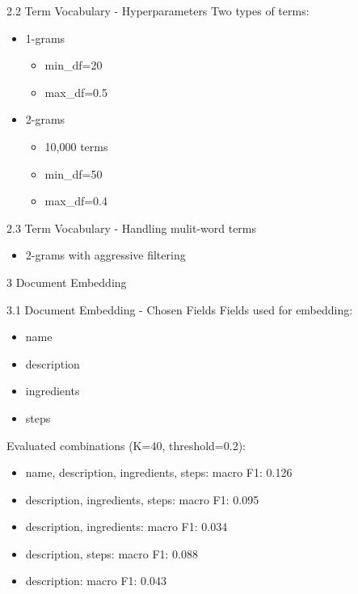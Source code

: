 \documentclass{beamer}
\begin{document}
\begin{frame}{2.2 Term Vocabulary - Hyperparameters}
  Two types of terms:
  \begin{itemize}
    \item 1-grams
          \begin{itemize}
            \item min\_df=20
            \item max\_df=0.5
          \end{itemize}
    \item 2-grams
          \begin{itemize}
            \item 10,000 terms
            \item min\_df=50
            \item max\_df=0.4
          \end{itemize}
  \end{itemize}

\end{frame}

\begin{frame}{2.3 Term Vocabulary - Handling mulit-word terms}
  \begin{itemize}
    \item 2-grams with aggressive filtering
  \end{itemize}
\end{frame}

\begin{frame}{3 Document Embedding}
\end{frame}

\begin{frame}{3.1 Document Embedding - Chosen Fields}
  Fields used for embedding:
  \begin{itemize}
    \item name
    \item description
    \item ingredients
    \item steps
  \end{itemize}

  Evaluated combinations (K=40, threshold=0.2):
  \begin{itemize}
    \item name, description, ingredients, steps: macro F1: 0.126
    \item description, ingredients, steps: macro F1: 0.095
    \item description, ingredients: macro F1: 0.034
    \item description, steps: macro F1: 0.088
    \item description: macro F1: 0.043
  \end{itemize}

\end{frame}
\end{document}
